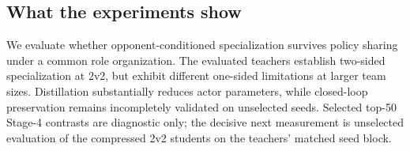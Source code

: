 \subsection{What the experiments show}
\label{sec:exp-takeaway}

We evaluate whether opponent-conditioned specialization survives policy
sharing under a common role organization. The evaluated teachers establish
two-sided specialization at 2v2, but exhibit different one-sided limitations
at larger team sizes. Distillation substantially reduces actor parameters,
while closed-loop preservation remains incompletely validated on unselected
seeds. Selected top-50 Stage-4 contrasts are diagnostic only; the decisive
next measurement is unselected evaluation of the compressed 2v2 students on
the teachers' matched seed block.
